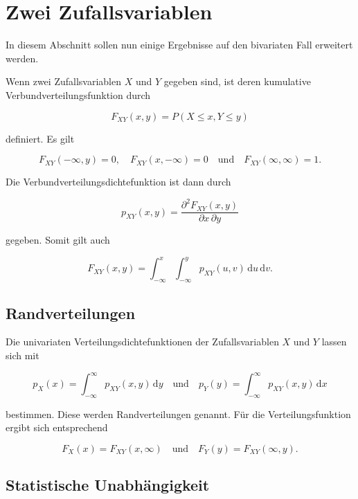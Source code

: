 \section{Zwei Zufallsvariablen}
\label{sec:zwei-zufallsvariablen}

In diesem Abschnitt sollen nun einige Ergebnisse auf den bivariaten Fall erweitert werden.

\begin{definition}
Wenn zwei Zufallsvariablen $X$ und $Y$ gegeben sind, ist deren kumulative Verbundverteilungsfunktion durch

$$
F_{XY}(x,y) = P(X \leq x, Y \leq y)
$$

definiert. Es gilt

$$
F_{XY}(-\infty, y) = 0, \quad F_{XY}(x, -\infty) = 0 \quad \text{und} \quad F_{XY}(\infty, \infty) = 1.
$$

Die Verbundverteilungsdichtefunktion ist dann durch

$$
p_{XY}(x,y) = \frac{\partial^2 F_{XY}(x,y)}{\partial x \, \partial y}
$$

gegeben. Somit gilt auch

$$
F_{XY}(x,y) = \int_{-\infty}^{x} \int_{-\infty}^{y} p_{XY}(u,v)\,\mathrm{d}u\,\mathrm{d}v.
$$
\end{definition}

\subsection{Randverteilungen}
\label{sec:randverteilungen}

\begin{definition}[Randverteilungen]
Die univariaten Verteilungsdichtefunktionen der Zufallsvariablen $X$ und $Y$ lassen sich mit

$$
p_X(x) = \int_{-\infty}^{\infty} p_{XY}(x,y)\,\mathrm{d}y \quad \text{und} \quad p_Y(y) = \int_{-\infty}^{\infty} p_{XY}(x,y)\,\mathrm{d}x
$$

bestimmen. Diese werden Randverteilungen genannt. Für die Verteilungsfunktion ergibt sich entsprechend

$$
F_X(x) = F_{XY}(x, \infty) \quad \text{und} \quad F_Y(y) = F_{XY}(\infty, y).
$$
\end{definition}

\subsection{Statistische Unabhängigkeit}
\label{sec:statistische-unabhaengigkeit}

